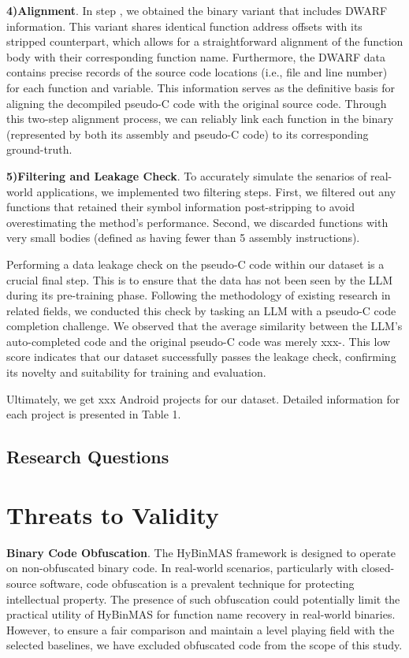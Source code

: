 \documentclass[acmsmall,screen,review,anonymous]{acmart} %
\begin{document}
\textbf{4)Alignment}. In step , we obtained the binary variant that includes DWARF information. This variant shares identical function address offsets with its stripped counterpart, which allows for a straightforward alignment of the function body with their corresponding function name. Furthermore, the DWARF data contains precise records of the source code locations (i.e., file and line number) for each function and variable. This information serves as the definitive basis for aligning the decompiled pseudo-C code with the original source code. Through this two-step alignment process, we can reliably link each function in the binary (represented by both its assembly and pseudo-C code) to its corresponding ground-truth.


\textbf{5)Filtering and Leakage Check}. To accurately simulate the senarios of real-world applications, we implemented two filtering steps. First, we filtered out any functions that retained their symbol information post-stripping to avoid overestimating the method's performance. Second, we discarded functions with very small bodies (defined as having fewer than 5 assembly instructions).

Performing a data leakage check on the pseudo-C code within our dataset is a crucial final step. This is to ensure that the data has not been seen by the LLM during its pre-training phase. Following the methodology of existing research in related fields, we conducted this check by tasking an LLM with a pseudo-C code completion challenge. We observed that the average similarity between the LLM's auto-completed code and the original pseudo-C code was merely xxx-. This low score indicates that our dataset successfully passes the leakage check, confirming its novelty and suitability for training and evaluation.

Ultimately, we get xxx Android projects for our dataset. Detailed information for each project is presented in Table 1.



\subsection{Research Questions}



\section{Threats to Validity}
\textbf{Binary Code Obfuscation}. The HyBinMAS framework is designed to operate on non-obfuscated binary code. In real-world scenarios, particularly with closed-source software, code obfuscation is a prevalent technique for protecting intellectual property. The presence of such obfuscation could potentially limit the practical utility of HyBinMAS for function name recovery in real-world binaries. However, to ensure a fair comparison and maintain a level playing field with the selected baselines, we have excluded obfuscated code from the scope of this study.
\end{document}
